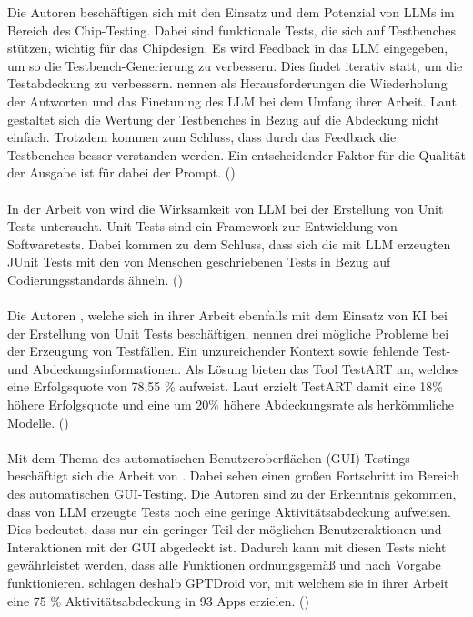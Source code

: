 \documentclass[12pt,toc=bib,toc=listof]{scrreprt}
\begin{document}
\noindent Die Autoren \textcite{Bhandari2024} beschäftigen sich mit den Einsatz und dem Potenzial von LLMs im Bereich des Chip-Testing. Dabei sind funktionale Tests, die sich auf Testbenches stützen, wichtig für das Chipdesign. Es wird Feedback in das LLM eingegeben, um so die Testbench-Generierung zu verbessern. Dies findet iterativ statt, um die Testabdeckung zu verbessern. \textcite{Bhandari2024} nennen als Herausforderungen die Wiederholung der Antworten und das Finetuning des LLM bei dem Umfang ihrer Arbeit. Laut \textcite{Bhandari2024} gestaltet sich die Wertung der Testbenches in Bezug auf die Abdeckung nicht einfach. Trotzdem kommen \textcite{Bhandari2024} zum Schluss, dass durch das Feedback die Testbenches besser verstanden werden. Ein entscheidender Faktor für die Qualität der Ausgabe ist für \textcite{Bhandari2024} dabei der Prompt. (\cite{Bhandari2024})\\
\\
In der Arbeit von \textcite{Ouédraogo2024} wird die Wirksamkeit von LLM bei der Erstellung von Unit Tests untersucht. Unit Tests sind ein Framework zur Entwicklung von Softwaretests. Dabei kommen \textcite{Ouédraogo2024} zu dem Schluss, dass sich die mit LLM erzeugten JUnit Tests mit den von Menschen geschriebenen Tests in Bezug auf Codierungsstandards ähneln. (\cite{Ouédraogo2024})\\
\\
Die Autoren \textcite{Gu2024}, welche sich in ihrer Arbeit ebenfalls mit dem Einsatz von KI bei der Erstellung von Unit Tests beschäftigen, nennen drei mögliche Probleme bei der Erzeugung von Testfällen.
Ein unzureichender Kontext sowie fehlende Test- und Abdeckungsinformationen. Als Lösung bieten \textcite{Gu2024} das Tool TestART an, welches eine Erfolgsquote von 78,55 \% aufweist. Laut \textcite{Gu2024} erzielt TestART damit eine 18\% höhere Erfolgsquote und eine um 20\% höhere Abdeckungsrate als herkömmliche Modelle. (\cite{Gu2024})\\
\\
Mit dem Thema des automatischen Benutzeroberflächen (GUI)-Testings beschäftigt sich die Arbeit von \textcite{Liu2024}. Dabei sehen \textcite{Liu2024} einen großen Fortschritt im Bereich des automatischen GUI-Testing. Die Autoren \textcite{Liu2024} sind zu der Erkenntnis gekommen, dass von LLM erzeugte Tests noch eine geringe Aktivitätsabdeckung aufweisen. Dies bedeutet, dass nur ein geringer Teil der möglichen Benutzeraktionen und Interaktionen mit der GUI abgedeckt ist. Dadurch kann mit diesen Tests nicht gewährleistet werden, dass alle Funktionen ordnungsgemäß und nach Vorgabe funktionieren. \textcite{Liu2024} schlagen deshalb GPTDroid vor, mit welchem sie in ihrer Arbeit eine 75 \% Aktivitätsabdeckung in 93 Apps erzielen. (\cite{Liu2024})\\
\end{document}
